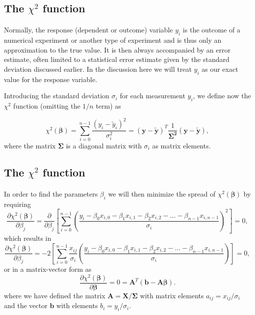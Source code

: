 \documentclass[%
oneside,                 %
final,                   %
10pt]{article}
\begin{document}
\subsection*{The $\chi^2$ function}

\paragraph{}

Normally, the response (dependent or outcome) variable $y_i$ is the
outcome of a numerical experiment or another type of experiment and is
thus only an approximation to the true value. It is then always
accompanied by an error estimate, often limited to a statistical error
estimate given by the standard deviation discussed earlier. In the
discussion here we will treat $y_i$ as our exact value for the
response variable.

Introducing the standard deviation $\sigma_i$ for each measurement
$y_i$, we define now the $\chi^2$ function (omitting the $1/n$ term)
as

\[
\chi^2(\bm{\beta})=\sum_{i=0}^{n-1}\frac{\left(y_i-\tilde{y}_i\right)^2}{\sigma_i^2}=\left(\bm{y}-\bm{\tilde{y}}\right)^T\frac{1}{\bm{\Sigma^2}}\left(\bm{y}-\bm{\tilde{y}}\right),
\]
where the matrix $\bm{\Sigma}$ is a diagonal matrix with $\sigma_i$ as matrix elements.



\subsection*{The $\chi^2$ function}

\paragraph{}

In order to find the parameters $\beta_i$ we will then minimize the spread of $\chi^2(\bm{\beta})$ by requiring
\[
\frac{\partial \chi^2(\bm{\beta})}{\partial \beta_j} = \frac{\partial }{\partial \beta_j}\left[ \sum_{i=0}^{n-1}\left(\frac{y_i-\beta_0x_{i,0}-\beta_1x_{i,1}-\beta_2x_{i,2}-\dots-\beta_{n-1}x_{i,n-1}}{\sigma_i}\right)^2\right]=0, 
\]
which results in
\[
\frac{\partial \chi^2(\bm{\beta})}{\partial \beta_j} = -2\left[ \sum_{i=0}^{n-1}\frac{x_{ij}}{\sigma_i}\left(\frac{y_i-\beta_0x_{i,0}-\beta_1x_{i,1}-\beta_2x_{i,2}-\dots-\beta_{n-1}x_{i,n-1}}{\sigma_i}\right)\right]=0, 
\]
or in a matrix-vector form as
\[
\frac{\partial \chi^2(\bm{\beta})}{\partial \bm{\beta}} = 0 = \bm{A}^T\left( \bm{b}-\bm{A}\bm{\beta}\right).  
\]
where we have defined the matrix $\bm{A} =\bm{X}/\bm{\Sigma}$ with matrix elements $a_{ij} = x_{ij}/\sigma_i$ and the vector $\bm{b}$ with elements $b_i = y_i/\sigma_i$.
\end{document}
